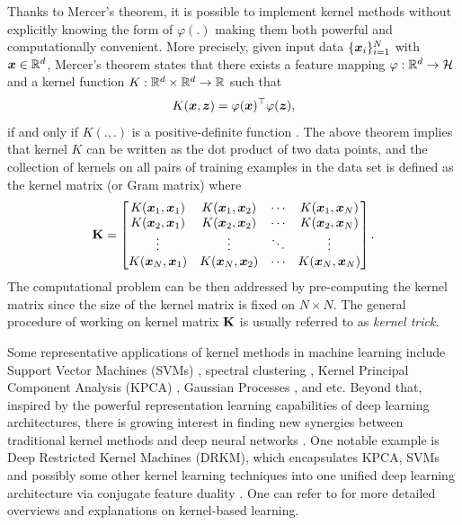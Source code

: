 Thanks to Mercer's theorem, it is possible to implement kernel methods without explicitly knowing the form of $\varphi(.)$ making them both powerful and computationally convenient. More precisely, given input data $\{\boldsymbol{x}_i\}_{i=1}^{N}$ with $\boldsymbol{x} \in \mathbb{R}^d$, Mercer's theorem states that there exists a feature mapping $\varphi: \mathbb{R}^d\to \mathcal{H}$ and a kernel function $K: \mathbb{R}^d \times \mathbb{R}^d \to \mathbb{R}$ such that 
\begin{equation}
    K(\boldsymbol{x},\boldsymbol{z}) = \varphi(\boldsymbol{x})^\top\varphi(\boldsymbol{z}),
\end{equation}
if and only if $K(.,.)$ is a positive-definite function \cite{suykensLeastSquaresSupport2002}. The above theorem implies that kernel $K$ can be written as the dot product of two data points, and the collection of kernels on all pairs of training examples in the data set is defined as the kernel matrix (or Gram matrix) where 
\begin{equation}
\mathbf{K} = \begin{bmatrix}
K(\boldsymbol{x}_1, \boldsymbol{x}_1) & K(\boldsymbol{x}_1, \boldsymbol{x}_2) & \cdots & K(\boldsymbol{x}_1, \boldsymbol{x}_N) \\
K(\boldsymbol{x}_2, \boldsymbol{x}_1) & K(\boldsymbol{x}_2, \boldsymbol{x}_2) & \cdots & K(\boldsymbol{x}_2, \boldsymbol{x}_N) \\
\vdots & \vdots & \ddots & \vdots \\
K(\boldsymbol{x}_N, \boldsymbol{x}_1) & K(\boldsymbol{x}_N, \boldsymbol{x}_2) & \cdots & K(\boldsymbol{x}_N, \boldsymbol{x}_N)
\end{bmatrix}.
\end{equation}
The computational problem can be then addressed by pre-computing the kernel matrix since the size of the kernel matrix is fixed on $N\times N$.
The general procedure of working on kernel matrix $\mathbf{K}$ is usually referred to as \emph{kernel trick}.

Some representative applications of kernel methods in machine learning include Support Vector Machines (SVMs) \cite{cortesSupportvectorNetworks1995}, spectral clustering \cite{ngSpectralClusteringAnalysis2001}, Kernel Principal Component Analysis (KPCA) \cite{scholkopfKernelPrincipalComponent1997}, Gaussian Processes \cite{rasmussenGaussianProcessesMachine2004}, and etc. Beyond that, inspired by the powerful representation learning capabilities of deep learning architectures, there is growing interest in finding new synergies between traditional kernel methods and deep neural networks \cite{choKernelMethodsDeep2009, chenOverviewDeepKernel2016}. One notable example is Deep Restricted Kernel Machines (DRKM), which encapsulates KPCA, SVMs and possibly some other kernel learning techniques into one unified deep learning architecture via conjugate feature duality \cite{suykensDeepRestrictedKernel2017}. One can refer to \cite{hofmannKernelMethodsMachine2008,scholkopfLearningKernelsSupport2018}  for more detailed overviews and explanations on kernel-based learning.



